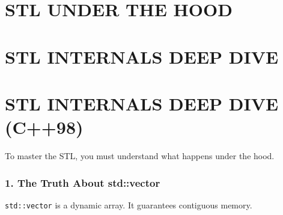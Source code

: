 \hypertarget{stl-under-the-hood}{%
\chapter{STL UNDER THE HOOD}\label{stl-under-the-hood}}

\hypertarget{stl-internals-deep-dive}{%
\chapter{STL INTERNALS DEEP DIVE}\label{stl-internals-deep-dive}}

\hypertarget{stl-internals-deep-dive-c98}{%
\chapter{STL INTERNALS DEEP DIVE
(C++98)}\label{stl-internals-deep-dive-c98}}

To master the STL, you must understand what happens under the hood.

\hypertarget{the-truth-about-stdvector}{%
\subsection{1. The Truth About
std::vector}\label{the-truth-about-stdvector}}

\passthrough{\lstinline!std::vector!} is a dynamic array. It guarantees
contiguous memory.

